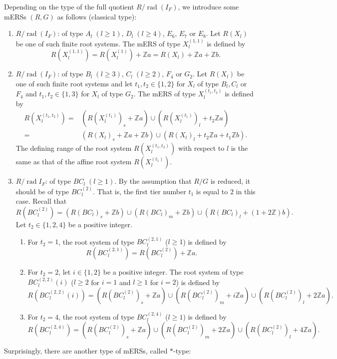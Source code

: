 \documentclass[11pt]{amsart}
\newcommand{\Z}{\mathbb{Z}}
\newcommand{\rad}{\operatorname{rad}}
\begin{document}
{Depending on the type of the full quotient $R/\rad(I_F)$, we introduce some mERSs $(R,G)$ as follows (classical type):
\begin{enumerate}
\item $R/\rad(I_F)$: of type $A_l\; (l\geq 1)$, $D_l\; (l\geq 4)$, $E_6$, $E_7$ or $E_8$. \quad
Let $R(X_l)$ be one of such finite root systems. The mERS of type $X_l^{(1,1)}$ is defined by
\[ R(X_l^{(1,1)})=R(X_l^{(1)})+\Z a=R(X_l)+\Z a+\Z b. \]
\item $R/\rad(I_F)$: of type $B_l\; (l\geq 3)$, $C_l\; (l\geq 2)$, $F_4$ or $G_2$. \quad
Let $R(X_l)$ be one of such finite root systems and let $t_1, t_2 \in \{1,2\}$ for $X_l$ of type $B_l, C_l$ or $F_4$ and $t_1,t_2 \in \{1,3\}$ for $X_l$ of type $G_2$. The mERS of type $X_l^{(t_1,t_2)}$ is defined by
\begin{align*}
R(X_l^{(t_1,t_2)})=
&(R(X_l^{(t_1)})_s+\Z a) \cup (R(X_l^{(t_1)})_l+t_2\Z a) \\
=
&(R(X_l)_s+\Z a+\Z b) \cup (R(X_l)_l+t_2\Z a+t_1\Z b). 
\end{align*}
The defining range of the root system $R(X_l^{(t_1,t_2)})$ with respect to $l$ is the same as that of the affine root system $R(X_l^{(t_1)})$. 
\item $R/\rad{I_F}$: of type $BC_l\; (l\geq 1)$.
\quad By the assumption that $R/G$ is reduced, it should be of type $BC_l^{(2)}$. That
is, the first tier number $t_1$ is equal to $2$ in this case. Recall that
\[ R(BC_l^{(2)})=(R(BC_l)_s+\Z b) \cup (R(BC_l)_m+\Z b) \cup (R(BC_l)_l+(1+2\Z)b). \]
Let $t_2 \in \{1,2,4\}$ be a positive integer.
\begin{enumerate}
\item[i)] For $t_2=1$, the root system of type 
$BC_l^{(2,1)}$ ($l\geq 1$) is defined by
\[
R(BC_l^{(2,1)})=R(BC_l^{(2)})+\Z a.
\]
\item[ii)] For $t_2=2$, let $i \in \{1,2\}$ be a positive integer. 
The root system of type $BC_l^{(2,2)}(i)$ 
($l\geq 2$ for $i=1$ and $l \geq 1$ for $i=2$) is defined by
\[
R(BC_l^{(2,2)}(i))=
(R(BC_l^{(2)})_s+\Z a) \cup (R(BC_l^{(2)})_m+i\Z a) \cup (R(BC_l^{(2)})_l+ 2\Z a).
\]
\item[iii)] For $t_2=4$, the root system of type $BC_l^{(2,4)}$ 
($l\geq 1$) is defined by
\[
R(BC_l^{(2,4)})=
(R(BC_l^{(2)})_s+\Z a) \cup (R(BC_l^{(2)})_m+2\Z a) \cup (R(BC_l^{(2)})_l+ 4\Z a).
\]
\end{enumerate}
\end{enumerate}
Surprisingly, there are another type of mERSs, called  $\ast$-type:
\begin{enumerate}

\end{enumerate}}
\end{document}
